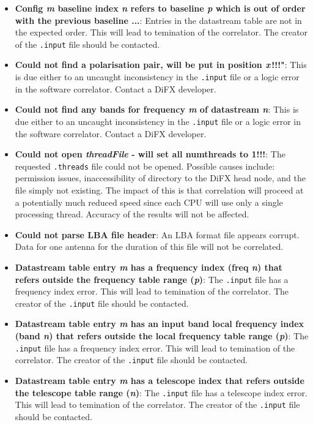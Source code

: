 \begin{itemize}
\item {\bf Config {\it m} baseline index {\it n} refers to baseline {\it p} which is out of order with the previous baseline ...}:
Entries in the datastream table are not in the expected order.
This will lead to temination of the correlator.
The creator of the {\tt .input} file should be contacted.

\item {\bf Could not find a polarisation pair, will be put in position {\it x}\,!!!"}:
This is due either to an uncaught inconsistency in the {\tt .input} file or a logic error in the software correlator.
Contact a DiFX developer.

\item {\bf Could not find any bands for frequency {\it m} of datastream {\it n}}:
This is due either to an uncaught inconsistency in the {\tt .input} file or a logic error in the software correlator.
Contact a DiFX developer.

\item {\bf Could not open {\it threadFile} - will set all numthreads to 1!!!}:
The requested {\tt .threads} file could not be opened.
Possible causes include: permission issues, inaccessibility of directory to the DiFX head node, and the file simply not existing.
The impact of this is that correlation will proceed at a potentially much reduced speed since each CPU will use only a single processing thread.
Accuracy of the results will not be affected.

\item {\bf Could not parse LBA file header}:
An LBA format file appears corrupt.
Data for one antenna for the duration of this file will not be correlated.

\item {\bf Datastream table entry {\it m} has a frequency index (freq {\it n}) that refers outside the frequency table range ({\it p})}:
The {\tt .input} file has a frequency index error.
This will lead to temination of the correlator.
The creator of the {\tt .input} file should be contacted.

\item {\bf Datastream table entry {\it m} has an input band local frequency index (band {\it n}) that refers outside the local frequency table range ({\it p})}:
The {\tt .input} file has a frequency index error.
This will lead to temination of the correlator.
The creator of the {\tt .input} file should be contacted.

\item {\bf Datastream table entry {\it m} has a telescope index that refers outside the telescope table range ({\it n})}:
The {\tt .input} file has a telescope index error.
This will lead to temination of the correlator.
The creator of the {\tt .input} file should be contacted.


\end{itemize}
